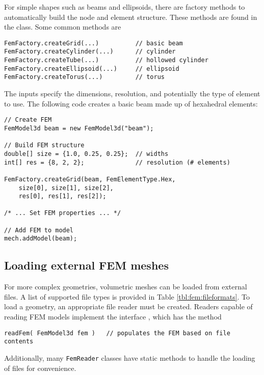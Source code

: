 For simple shapes such as beams and ellipsoids, there are factory methods to 
automatically build the node and element structure.  These methods are found
in the  class.  Some common
methods are
\begin{lstlisting}[]
FemFactory.createGrid(...)          // basic beam
FemFactory.createCylinder(...)      // cylinder
FemFactory.createTube(...)          // hollowed cylinder
FemFactory.createEllipsoid(...)     // ellipsoid
FemFactory.createTorus(...)         // torus
\end{lstlisting}
The inputs specify the dimensions, resolution, and potentially the type
of element to use.  The following code creates a basic beam made up of
hexahedral elements:
\begin{lstlisting}[]
// Create FEM
FemModel3d beam = new FemModel3d("beam");
      
// Build FEM structure
double[] size = {1.0, 0.25, 0.25};  // widths
int[] res = {8, 2, 2};              // resolution (# elements)
      
FemFactory.createGrid(beam, FemElementType.Hex,
	size[0], size[1], size[2], 
	res[0], res[1], res[2]);

/* ... Set FEM properties ... */

// Add FEM to model
mech.addModel(beam);
\end{lstlisting}

\subsection{Loading external FEM meshes}
\label{FemGeometryFiles:sec}

For more complex geometries, volumetric meshes can be loaded from external
files.  A list of supported file types is provided in Table 
\ref{tbl:fem:fileformats}. To load a geometry, an appropriate file reader
must be created.  Readers capable of reading FEM models implement the 
interface , which has the
method
\begin{lstlisting}[]
readFem( FemModel3d fem )   // populates the FEM based on file contents
\end{lstlisting}
Additionally, many {\tt FemReader} classes have static methods to handle
the loading of files for convenience.

